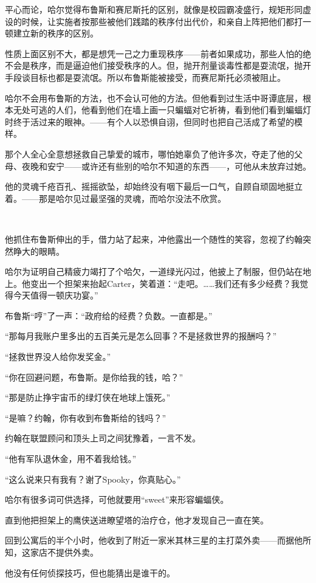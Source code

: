 \documentclass[../main.tex]{subfiles}
\begin{document}
平心而论，哈尔觉得布鲁斯和赛尼斯托的区别，就像是校园霸凌盛行，规矩形同虚设的时候，让实施者按那些被他们践踏的秩序付出代价，和亲自上阵把他们都打一顿建立新的秩序的区别。

性质上面区别不大，都是想凭一己之力重现秩序——前者如果成功，那些人怕的绝不会是秩序，而是逼迫他们接受秩序的人。但，抛开剂量谈毒性都是耍流氓，抛开手段谈目标也都是耍流氓。所以布鲁斯能被接受，而赛尼斯托必须被阻止。

哈尔不会用布鲁斯的方法，也不会认可他的方法。但他看到过生活中哥谭底层，根本无处可逃的人们，他看到他们在墙上画一只蝙蝠对它祈祷，看到他们看到蝙蝠灯时终于活过来的眼神。——有个人以恐惧自诩，但同时也把自己活成了希望的模样。

那个人全心全意想拯救自己挚爱的城市，哪怕她辜负了他许多次，夺走了他的父母、夜晚和安宁——或许还有些别的哈尔不知道的东西——，可他从未放弃过她。

他的灵魂千疮百孔、摇摇欲坠，却始终没有咽下最后一口气，自顾自顽固地挺立着。——那是哈尔见过最坚强的灵魂，而哈尔没法不欣赏。

~\

他抓住布鲁斯伸出的手，借力站了起来，冲他露出一个随性的笑容，忽视了约翰突然睁大的眼睛。

哈尔为证明自己精疲力竭打了个哈欠，一道绿光闪过，他披上了制服，但仍站在地上。他变出一个担架来抬起Carter，笑着道：“走吧。……我们还有多少经费？我觉得今天值得一顿庆功宴。”

布鲁斯“哼”了一声：“政府给的经费？负数。一直都是。”

“那每月我账户里多出的五百美元是怎么回事？不是拯救世界的报酬吗？”

“拯救世界没人给你发奖金。”

“你在回避问题，布鲁斯。是你给我的钱，哈？”

“那是防止挣宇宙币的绿灯侠在地球上饿死。”

“是嘛？约翰，你有收到布鲁斯给的钱吗？”

约翰在联盟顾问和顶头上司之间犹豫着，一言不发。

“他有军队退休金，用不着我给钱。”

“这么说来只有我有？谢了Spooky，你真贴心。”

哈尔有很多词可供选择，可他就要用“sweet”来形容蝙蝠侠。

直到他把担架上的鹰侠送进瞭望塔的治疗仓，他才发现自己一直在笑。

回到公寓后的半个小时，他收到了附近一家米其林三星的主打菜外卖——而据他所知，这家店不提供外卖。

他没有任何侦探技巧，但也能猜出是谁干的。
\end{document}
